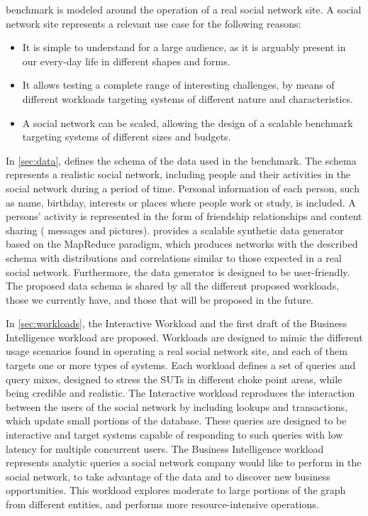 \ldbcsnb benchmark is modeled around the operation of a real social network
site. A social network site represents a relevant use case for the following
reasons:

\begin{itemize}
    \item It is simple to understand for a large audience, as it is
        arguably present in our every-day life in different shapes and forms.
    \item It allows testing a complete range of interesting
        challenges, by means of different workloads targeting systems of
        different nature and characteristics.
    \item A social network can be scaled, allowing the design of a
        scalable benchmark targeting systems of different sizes and budgets.
\end{itemize}

In \autoref{sec:data}, \ldbcsnb defines the schema of the data used in
the benchmark. The schema represents a realistic social network, including
people and their activities in the social network during a period of time.
Personal information of each person, such as name, birthday, interests
or places where people work or study, is included. A persons' activity is
represented in the form of friendship relationships and content sharing (\ie
messages and pictures). \ldbcsnb provides a scalable synthetic data generator
based on the MapReduce paradigm, which produces networks with the
described schema with distributions and correlations similar to those expected
in a real social network. Furthermore, the data generator is designed to be
user-friendly. The proposed data schema is shared by all the different proposed
workloads, those we currently have, and those that will be proposed in the future.

In \autoref{sec:workloads}, the Interactive Workload and the first draft of
the Business Intelligence workload are proposed. Workloads are designed to mimic
the different usage scenarios found in operating a real social network site, and
each of them targets one or more types of systems.  Each workload defines a set
of queries and query mixes, designed to stress the SUTs in different choke point
areas, while being credible and realistic. The Interactive workload reproduces the
interaction between the users of the social network by including lookups and
transactions, which update small portions of the database. These queries are
designed to be interactive and target systems capable of responding to such queries
with low latency for multiple concurrent users. The Business Intelligence workload
represents analytic queries a social network company would
like to perform in the social network, to take advantage of the data and to
discover new business opportunities. This workload explores moderate to large
portions of the graph from different entities, and performs more resource-intensive
operations.

